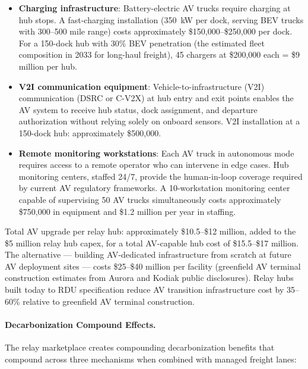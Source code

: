 \begin{itemize}
  \item \textbf{Charging infrastructure}: Battery-electric AV trucks require charging at hub
  stops. A fast-charging installation (350~kW per dock, serving BEV trucks with 300--500 mile
  range) costs approximately \$150,000--\$250,000 per dock. For a 150-dock hub with 30\%
  BEV penetration (the estimated fleet composition in 2033 for long-haul freight), 45 chargers
  at \$200,000 each = \$9 million per hub.

  \item \textbf{V2I communication equipment}: Vehicle-to-infrastructure (V2I) communication
  (DSRC or C-V2X) at hub entry and exit points enables the AV system to receive hub status,
  dock assignment, and departure authorization without relying solely on onboard sensors.
  V2I installation at a 150-dock hub: approximately \$500,000.

  \item \textbf{Remote monitoring workstations}: Each AV truck in autonomous mode requires
  access to a remote operator who can intervene in edge cases. Hub monitoring centers, staffed
  24/7, provide the human-in-loop coverage required by current AV regulatory frameworks.
  A 10-workstation monitoring center capable of supervising 50 AV trucks simultaneously
  costs approximately \$750,000 in equipment and \$1.2 million per year in staffing.
\end{itemize}

Total AV upgrade per relay hub: approximately \$10.5--\$12 million, added to the \$5 million
relay hub capex, for a total AV-capable hub cost of \$15.5--\$17 million. The alternative ---
building AV-dedicated infrastructure from scratch at future AV deployment sites --- costs
\$25--\$40 million per facility (greenfield AV terminal construction estimates from Aurora and
Kodiak public disclosures). Relay hubs built today to RDU specification reduce AV transition
infrastructure cost by 35--60\% relative to greenfield AV terminal construction.

\paragraph{Decarbonization Compound Effects.}

The relay marketplace creates compounding decarbonization benefits that compound across three mechanisms when combined with managed freight lanes:


